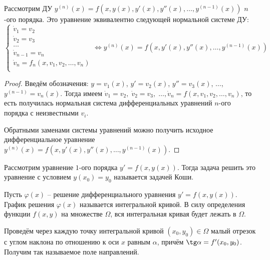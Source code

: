 \begin{proposition}
    Рассмотрим ДУ $y^{(n)}(x) = f(x, y(x), y'(x), y''(x), \dots, y^{(n-1)}(x))$ $n$-ого порядка. Это уравнение эквивалентно следующей нормальной системе ДУ:
    \begin{equation}
        \begin{cases}
            \dot v_1 = v_2 \\
            \dot v_2 = v_3 \\
            \dots \\
            \dot v_{n-1} = v_n \\
            \dot v_n = f_n(x, v_1, v_2, \dots, v_n) \\
        \end{cases}
        \Leftrightarrow y^{(n)}(x) = f(x, y'(x), y''(x), \dots, y^{(n-1)}(x))
    \end{equation}
\end{proposition}

\begin{proof}
    Введём обозначения: $y = v_1(x)$, $y' = v_2(x)$,
    $y'' = v_3(x)$, $\dots$, $y^{(n - 1)} = v_n(x)$. Тогда имеем $\dot v_1 = v_2, \; \dot v_2 = v_3, \; \dots, \dot v_n = f(x, v_1, v_2, \dots, v_n)$, то есть получилась нормальная система дифференциальных уравнений $n$-ого порядка с неизвестными $v_i$.

    Обратными заменами системы уравнений можно получить исходное дифференциальное уравнение $y^{(n)}(x) = f(x, y'(x), y''(x), \dots, y^{(n-1)}(x))$.
\end{proof}

\begin{definition}
    Рассмотрим уравнение $1$-ого порядка $y' = f(x, y(x))$. Тогда задача решить это уравнение с условием $y(x_0) = y_0$ называется задачей Коши.
\end{definition}

\begin{definition}
    Пусть $\varphi(x)$ -- решение дифференциального уравнения $y' = f(x, y(x))$. График решения $\varphi(x)$ называется интегральной кривой. В силу определения функции $f(x, y)$ на множестве $\Omega$, вся интегральная кривая будет лежать в $\Omega$.
\end{definition}

\begin{definition}
    Проведём через каждую точку интегральной кривой $(x_0, y_0) \in \Omega$ малый отрезок с углом наклона по отношению к оси $x$ равным $\alpha$, причём $\tg \alpha = f'(x_0, y_0)$. Получим так называемое поле направлений. 
\end{definition}

